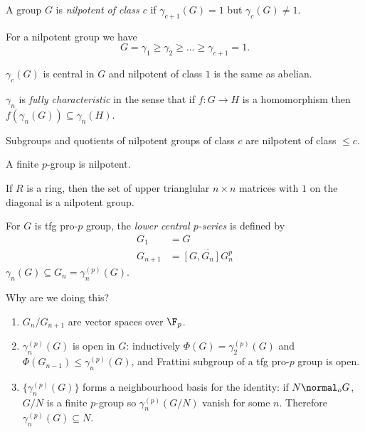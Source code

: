 \documentclass[a4paper]{article}
\begin{document}
\begin{definition}
  A group \(G\) is \emph{nilpotent of class \(c\)} if \(\gamma_{c + 1}(G) = 1\) but \(\gamma_c(G) \ne 1\).
\end{definition}

For a nilpotent group we have
\[
  G = \gamma_1 \geq \gamma_2 \geq \dots \geq \gamma_{c + 1} = 1.
\]

\begin{note}
  \(\gamma_c(G)\) is central in \(G\) and nilpotent of class \(1\) is the same as abelian.
\end{note}

\begin{proposition}
  \(\gamma_n\) is \emph{fully characteristic} in the sense that if \(f: G \to H\) is a homomorphism then \(f(\gamma_n(G)) \subseteq \gamma_n(H)\).
\end{proposition}

\begin{proposition}
  Subgroups and quotients of nilpotent groups of class \(c\) are nilpotent of class \(\leq c\).
\end{proposition}

\begin{proposition}
  A finite \(p\)-group is nilpotent.
\end{proposition}

\begin{ex}
  If \(R\) is a ring, then the set of upper trianglular \(n \times n\) matrices with \(1\) on the diagonal is a nilpotent group.
\end{ex}

\begin{definition}
  For \(G\) is tfg pro-\(p\) group, the \emph{lower central \(p\)-series} is defined by
  \begin{align*}
    G_1 &= G \\
    G_{n + 1} &= \overline{[G, G_n] G_n^p}
  \end{align*}
  \(\gamma_n(G) \subseteq G_n = \gamma_n^{(p)}(G)\).
\end{definition}

Why are we doing this?
\begin{enumerate}
\item \(G_n/G_{n + 1}\) are vector spaces over \(\F_p\).
\item \(\gamma_n^{(p)}(G)\) is open in \(G\): inductively \(\Phi(G) = \gamma_2^{(p)}(G)\) and \(\Phi(G_{n - 1}) \leq \gamma_n^{(p)}(G)\), and Frattini subgroup of a tfg pro-\(p\) group is open.
\item \(\{\gamma_n^{(p)}(G)\}\) forms a neighbourhood basis for the identity: if \(N \normal_o G\), \(G/N\) is a finite \(p\)-group so \(\gamma_n^{(p)}(G/N)\) vanish for some \(n\). Therefore \(\gamma_n^{(p)}(G) \subseteq N\).
\end{enumerate}
\end{document}
